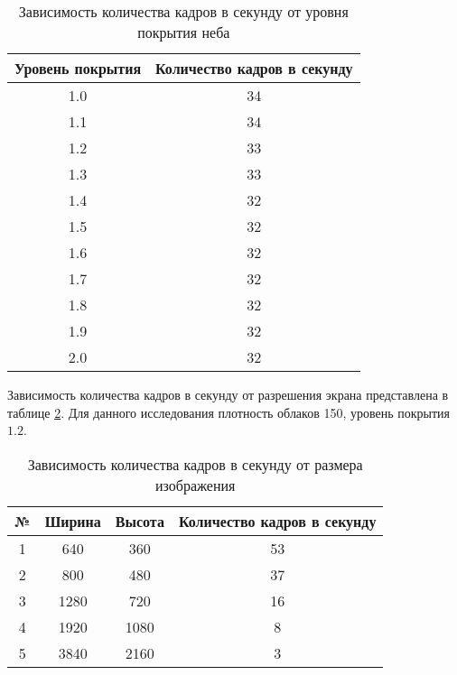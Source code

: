 \begin{table}[H]
	\begin{center}
		\begin{threeparttable}
			\captionsetup{justification=raggedright,singlelinecheck=off}
			\caption{Зависимость количества кадров в секунду от уровня покрытия неба}
			\label{tbl:covfps}
			\begin{tabular}{|c|c|}
				\hline
				Уровень покрытия &  Количество кадров в секунду \\
					\hline
				1.0 & 34 \\
				\hline
				1.1 & 34 \\
				\hline
				1.2 & 33 \\
				\hline
				1.3 & 33 \\
				\hline
				1.4 & 32 \\
				\hline
				1.5 & 32 \\
				\hline
				1.6 & 32 \\
				\hline
				1.7 & 32 \\
				\hline
				1.8 & 32 \\
				\hline
				1.9 & 32 \\
				\hline
				2.0 & 32 \\
				\hline
			\end{tabular}
		\end{threeparttable}
	\end{center}
\end{table}


Зависимость количества кадров в секунду от разрешения экрана представлена в таблице \ref{tbl:resfps}. Для данного исследования плотность облаков 150, уровень покрытия $1.2$.

\begin{table}[H]
	\begin{center}
		\begin{threeparttable}
			\captionsetup{justification=raggedright,singlelinecheck=off}
			\caption{Зависимость количества кадров в секунду от размера изображения}
			\label{tbl:resfps}
			\begin{tabular}{|c|c|c|c|}
				\hline
				№ & Ширина & Высота & Количество кадров в секунду \\
				\hline
				1 & 640 & 360 & 53 \\
				\hline
				2 & 800 & 480 & 37 \\
				\hline
				3 & 1280 & 720 & 16 \\
				\hline
				4 & 1920 & 1080 & 8 \\
				\hline
				5 & 3840 & 2160 & 3 \\
				\hline
			\end{tabular}
		\end{threeparttable}
	\end{center}
\end{table}